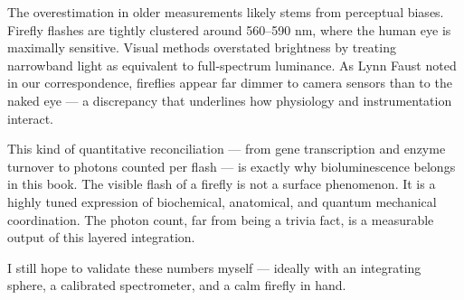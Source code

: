 \begin{commentary}
The overestimation in older measurements likely stems from perceptual biases. Firefly flashes are tightly clustered around 560–590 nm, where the human eye is maximally sensitive. Visual methods overstated brightness by treating narrowband light as equivalent to full-spectrum luminance. As Lynn Faust noted in our correspondence, fireflies appear far dimmer to camera sensors than to the naked eye — a discrepancy that underlines how physiology and instrumentation interact.

This kind of quantitative reconciliation — from gene transcription and enzyme turnover to photons counted per flash — is exactly why bioluminescence belongs in this book. The visible flash of a firefly is not a surface phenomenon. It is a highly tuned expression of biochemical, anatomical, and quantum mechanical coordination. The photon count, far from being a trivia fact, is a measurable output of this layered integration.

I still hope to validate these numbers myself — ideally with an integrating sphere, a calibrated spectrometer, and a calm firefly in hand.
\end{commentary}
